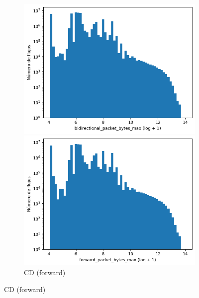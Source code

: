 \begin{figure}[H]
    \centering
    \hfill
    \begin{subfigure}[b]{0.26\textwidth}
        \centering
        \includegraphics[width=\textwidth]{media/packet_pincer_cicddos/bidirectional_packet_bytes_max_log_x_log_y.png}
        \caption{CD (bidir.)}
        \includegraphics[width=\textwidth]{media/packet_pincer_cicddos/forward_packet_bytes_max_log_x_log_y.png}
        \caption{CD (forward)}

\end{subfigure}
\end{figure}
